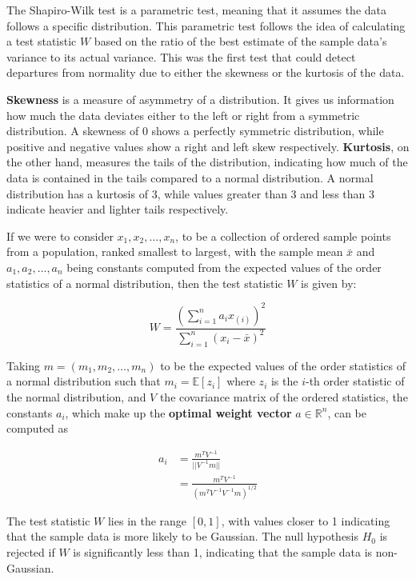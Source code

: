 \documentclass[12pt]{article}
\begin{document}
The Shapiro-Wilk test \cite{Shapiro1965} is a parametric test, meaning that it assumes the data follows a specific distribution. This parametric test follows the idea of calculating a test statistic $W$ based on the ratio of the best estimate of the sample data's variance to its actual variance. This was the first test that could detect departures from normality due to either the skewness or the kurtosis of the data.

\medskip
\noindent\textbf{Skewness} is a measure of asymmetry of a distribution. It gives us information how much the data deviates either to the left or right from a symmetric distribution. A skewness of 0 shows a perfectly symmetric distribution, while positive and negative values show a right and left skew respectively. \textbf{Kurtosis}, on the other hand, measures the tails of the distribution, indicating how much of the data is contained in the tails compared to a normal distribution. A normal distribution has a kurtosis of 3, while values greater than 3 and less than 3 indicate heavier and lighter tails respectively.

\medskip
\noindent If we were to consider $x_1, x_2, \ldots, x_n$, to be a collection of ordered sample points from a population, ranked smallest to largest, with the sample mean $\bar{x}$ and $a_1, a_2, \ldots, a_n$ being constants computed from the expected values of the order statistics of a normal distribution, then the test statistic $W$ is given by:

\begin{equation}
    W = \frac{(\sum\limits_{i=1}^{n} a_i x_{(i)})^2}{\sum\limits_{i=1}^{n} (x_i - \bar{x})^2}
    \label{eq:shapiro_wilk_statistic}
\end{equation}

\medskip
\noindent Taking $m = (m_1, m_2, \ldots, m_n)$ to be the expected values of the order statistics of a normal distribution such that $m_i = \mathbb{E}[z_i]$ where $z_i$ is the $i$-th order statistic of the normal distribution, and $V$ the covariance matrix of the ordered statistics, the constants $a_i$, which make up the \textbf{optimal weight vector} $a \in \mathbb{R}^n$, can be computed as

\begin{align}
    a_i &= \frac{m^T V^{-1}}{||V^{-1} m||} \\
        &= \frac{m^T V^{-1}}{(m^T V^{-1}V^{-1}m)^{1/2}}
    \label{eq:shapiro_wilk_constants}
\end{align}

\medskip
\noindent The test statistic $W$ lies in the range $[0, 1]$, with values closer to 1 indicating that the sample data is more likely to be Gaussian. The null hypothesis $H_0$ is rejected if $W$ is significantly less than 1, indicating that the sample data is non-Gaussian.
\end{document}
